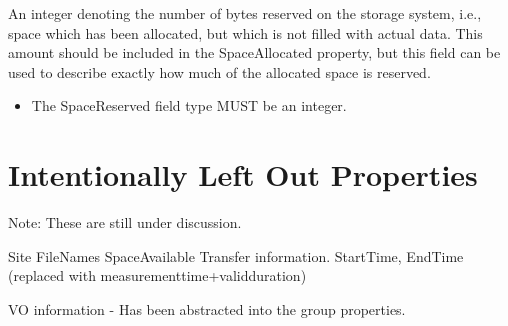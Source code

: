 An integer denoting the number of bytes reserved on the storage system, i.e.,
space which has been allocated, but which is not filled with actual data. This
amount should be included in the SpaceAllocated property, but this field can be
used to describe exactly how much of the allocated space is reserved.

\begin{itemize}
\item The SpaceReserved field type MUST be an integer.
\end{itemize}







\section{Intentionally Left Out Properties}

Note: These are still under discussion.

Site
FileNames
SpaceAvailable
Transfer information.
StartTime, EndTime (replaced with measurementtime+validduration)

VO information - Has been abstracted into the group properties.


